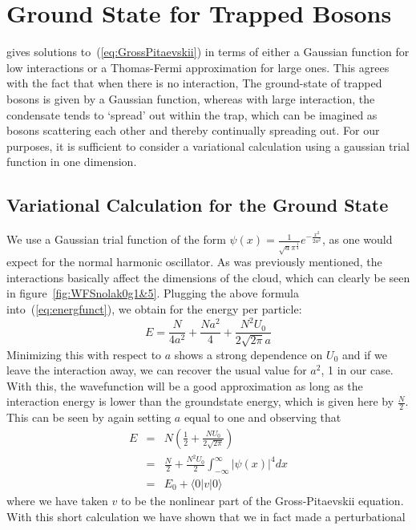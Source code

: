 \section{Ground State for Trapped Bosons}
\cite{pethick} gives solutions to~(\ref{eq:GrossPitaevskii}) in terms of either a Gaussian function for low interactions or a Thomas-Fermi approximation for large ones. This agrees with the fact that when there is no interaction, The ground-state of trapped bosons is given by a Gaussian function, whereas with large interaction, the condensate tends to `spread' out within the trap, which can be imagined as bosons scattering each other and thereby continually spreading out. For our purposes, it is sufficient to consider a variational calculation using a gaussian trial function in one dimension.

\subsection{Variational Calculation for the Ground State}
We use a Gaussian trial function of the form $\psi(x)=\frac{1}{\sqrt{a}\pi^{\frac{1}{4}}}e^{-\frac{x^2}{2a^2}}$, as one would expect for the normal harmonic oscillator. As was 
previously mentioned, the interactions basically affect the dimensions of the cloud, which can clearly be seen in figure~\ref{fig:WFSnolak0g1&5}. Plugging the above 
formula into~(\ref{eq:energfunct}), we obtain for the energy per particle:
\begin{equation}\label{eq:epp}
	E=\frac{N}{4a^2}+\frac{Na^2}{4}+\frac{N^2U_0}{2\sqrt{2\pi}a}
\end{equation}
Minimizing this with respect to $a$ shows a strong dependence on $U_0$ and if we leave the interaction away, we can recover the usual value for $a^2$, 1 in our case. 
With this, the wavefunction will be a good approximation as long as the interaction energy is lower than the groundstate energy, which is given here by $\frac{N}{2}$. 
This can be seen by again setting $a$ equal to one and observing that
\begin{eqnarray}
	E&=&N\left(\frac{1}{2}+\frac{NU_0}{2\sqrt{2\pi}}\right)\nonumber\\
	   &=&\frac{N}{2} + \frac{N^2U_0}{2}\int_{-\infty}^{\infty}|\psi(x)|^4dx\nonumber \\
	   &=&E_0 + \langle0|v|0\rangle\nonumber
\end{eqnarray}
where we have taken $v$ to be the nonlinear part of the Gross-Pitaevskii equation. With this short calculation we have shown that we in fact made a perturbational 
